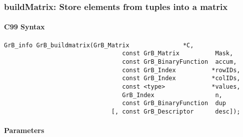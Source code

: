 \subsubsection{{\sf buildMatrix}: Store elements from tuples into a matrix}
\label{Sec:buildMatrix}


\paragraph{C99 Syntax}

\begin{Verbatim}[samepage=true]	
        GrB_info GrB_buildmatrix(GrB_Matrix               *C,
                                 const GrB_Matrix          Mask,
                                 const GrB_BinaryFunction  accum,
                                 const GrB_Index          *rowIDs,
                                 const GrB_Index          *colIDs, 
                                 const <type>             *values,
                                 GrB_Index                 n,
                                 const GrB_BinaryFunction  dup
                              [, const GrB_Descriptor      desc]);
\end{Verbatim}

\paragraph{Parameters}

